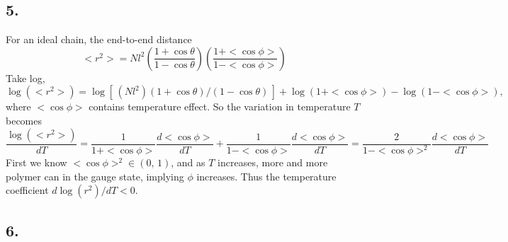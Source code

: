 \documentclass[a4paper]{article}
\begin{document}
\subsection*{5.}
For an ideal chain, the end-to-end distance
\[
    <r^2> = N l^2 \left( \frac{1+\cos \theta}{1-\cos \theta} \right) \left(\frac{1+<\cos \phi>}{1-<\cos \phi> }\right)
\]
Take log,
\[
    \log(<r^2>) = \log[\, (N l^2)(1+\cos \theta)/(1-\cos \theta)\,]
        + \log(1+<\cos\phi>) - \log (1-<\cos\phi>),
\]
where $<\cos\phi>$ contains temperature effect.
So the variation in temperature $T$ becomes
\[
\frac{ \log(<r^2>)}{dT} = \frac{1}{1+<\cos \phi>} \frac{d <\cos \phi>}{d T} + \frac{1}{1-<\cos \phi>}\frac{d <\cos \phi>}{d T}
= \frac{2}{1-<\cos\phi>^2} \frac{d<\cos \phi>}{dT}
\]
First we know $<\cos\phi>^2 \in (0,\,1)$, and as $T$ increases, more and more polymer can in the gauge state, implying $\phi$ increases.
Thus the temperature coefficient $d\log(r^2)/dT < 0$.



\subsection*{6.}
    
\end{document}

